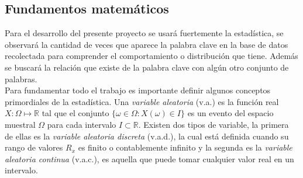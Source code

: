 \subsection {Fundamentos matemáticos}
Para el desarrollo del presente proyecto se usar\'a fuertemente la estadística, se observar\'a la cantidad de veces que aparece la palabra clave en la base de datos recolectada para comprender el comportamiento o distribución que tiene. Además se buscará la relación que existe de la palabra clave con algún otro conjunto de palabras. \\


\noindent Para fundamentar todo el trabajo es importante definir algunos conceptos primordiales de la estadística.  Una  \emph{variable aleatoria} (v.a.) es la función real $X: \Omega\mapsto\mathbb{R}$ tal que el conjunto $\{\omega\in\Omega:X(\omega)\in I\}$ es un evento del espacio muestral $\Omega$ para cada intervalo $I\subset\mathbb{R}$. Existen dos tipos de variable, la primera de ellas es la \emph{variable aleatoria discreta} (v.a.d.), la cual está definida  cuando su rango de valores $R_x$ es finito o contablemente infinito y la segunda es la \emph{variable aleatoria continua} (v.a.c.), es aquella que puede tomar cualquier valor real en un intervalo.\\




